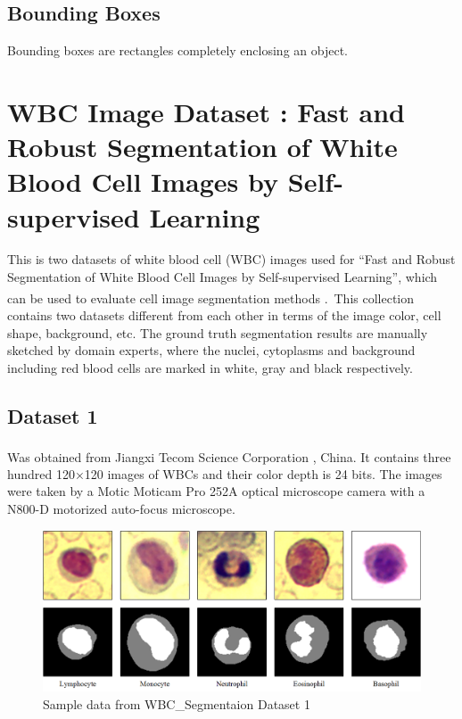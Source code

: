 \subsection{Bounding Boxes}
\hspace{\parindent}
Bounding boxes are rectangles completely enclosing an object.

\vspace{-0.1in}

\section{WBC Image Dataset : Fast and Robust Segmentation of White Blood Cell Images by Self-supervised Learning}
\hspace{\parindent}
This is two datasets of white blood cell (WBC) images used for “Fast and Robust Segmentation of White Blood Cell Images by Self-supervised Learning”, which can be used to evaluate cell image segmentation methods \textsuperscript{\cite{Zheng2018}}.\
This collection contains two datasets different from each other in terms of the image color, cell shape, background, etc. The ground truth segmentation results are manually sketched by domain experts, where the nuclei, cytoplasms and background including red blood cells are marked in white, gray and black respectively. 

\subsection{Dataset 1}
\hspace{\parindent}
Was obtained from Jiangxi Tecom Science Corporation \textsuperscript{\cite{2022_tecom-cn}}, China. It contains three hundred 120×120 images of WBCs and their color depth is 24 bits. The images were taken by a Motic Moticam Pro 252A optical microscope camera with a N800-D motorized auto-focus microscope.

\begin{figure}[H]
\centering
\includegraphics[width=5.2in]{../images/WBC_Dataset1.png}
\caption{Sample data from WBC\_Segmentaion Dataset 1}
\label{fig:WBC_Dataset1_sample}
\end{figure}

